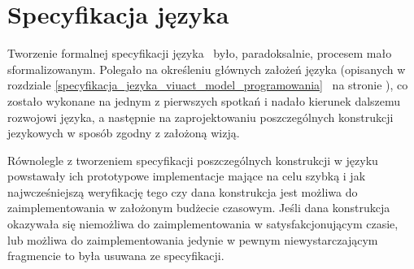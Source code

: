 \section{Specyfikacja języka \ViuAct}

Tworzenie formalnej specyfikacji języka \ViuAct\ było, paradoksalnie, procesem
mało sformalizowanym. Polegało na określeniu głównych założeń języka (opisanych
w rozdziale
\ref{specyfikacja_jezyka_viuact_model_programowania}~
na stronie \pageref{specyfikacja_jezyka_viuact_model_programowania}), co zostało
wykonane na jednym z pierwszych spotkań i nadało kierunek dalszemu rozwojowi
języka, a następnie na zaprojektowaniu poszczególnych konstrukcji jezykowych w
sposób zgodny z założoną wizją.

Równolegle z tworzeniem specyfikacji poszczególnych konstrukcji w języku
powstawały ich prototypowe implementacje mające na celu szybką i jak
najwcześniejszą weryfikację tego czy dana konstrukcja jest możliwa do
zaimplementowania w założonym budżecie czasowym. Jeśli dana konstrukcja
okazywała się niemożliwa do zaimplementowania w satysfakcjonującym czasie, lub
możliwa do zaimplementowania jedynie w pewnym niewystarczającym fragmencie to
była usuwana ze specyfikacji.
